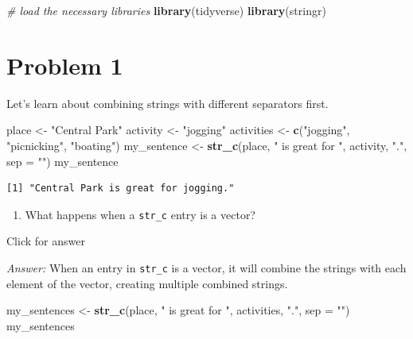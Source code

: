 \documentclass[
]{book}
\newenvironment{Shaded}{\begin{snugshade}}{\end{snugshade}}
\newcommand{\AttributeTok}[1]{\textcolor[rgb]{0.13,0.29,0.53}{#1}}
\newcommand{\CommentTok}[1]{\textcolor[rgb]{0.56,0.35,0.01}{\textit{#1}}}
\newcommand{\FunctionTok}[1]{\textcolor[rgb]{0.13,0.29,0.53}{\textbf{#1}}}
\newcommand{\NormalTok}[1]{#1}
\newcommand{\OtherTok}[1]{\textcolor[rgb]{0.56,0.35,0.01}{#1}}
\newcommand{\StringTok}[1]{\textcolor[rgb]{0.31,0.60,0.02}{#1}}
\providecommand{\tightlist}{%
  \setlength{\itemsep}{0pt}\setlength{\parskip}{0pt}}
\begin{document}
\begin{Shaded}
\begin{Highlighting}[]
\CommentTok{\# load the necessary libraries}
\FunctionTok{library}\NormalTok{(tidyverse)}
\FunctionTok{library}\NormalTok{(stringr)}
\end{Highlighting}
\end{Shaded}

\hypertarget{problem-1}{%
\section{Problem 1}\label{problem-1}}

Let's learn about combining strings with different separators first.

\begin{Shaded}
\begin{Highlighting}[]
\NormalTok{place }\OtherTok{\textless{}{-}} \StringTok{"Central Park"}
\NormalTok{activity }\OtherTok{\textless{}{-}} \StringTok{"jogging"}
\NormalTok{activities }\OtherTok{\textless{}{-}} \FunctionTok{c}\NormalTok{(}\StringTok{"jogging"}\NormalTok{, }\StringTok{"picnicking"}\NormalTok{, }\StringTok{"boating"}\NormalTok{)}
\NormalTok{my\_sentence }\OtherTok{\textless{}{-}} \FunctionTok{str\_c}\NormalTok{(place, }\StringTok{" is great for "}\NormalTok{, activity, }\StringTok{"."}\NormalTok{, }\AttributeTok{sep =} \StringTok{""}\NormalTok{)}
\NormalTok{my\_sentence}
\end{Highlighting}
\end{Shaded}

\begin{verbatim}
[1] "Central Park is great for jogging."
\end{verbatim}

\begin{enumerate}
\def\labelenumi{\alph{enumi}.}
\tightlist
\item
  What happens when a \texttt{str\_c} entry is a vector?
\end{enumerate}

Click for answer

\emph{Answer:} When an entry in \texttt{str\_c} is a vector, it will combine the strings with each element of the vector, creating multiple combined strings.

\begin{Shaded}
\begin{Highlighting}[]
\NormalTok{my\_sentences }\OtherTok{\textless{}{-}} \FunctionTok{str\_c}\NormalTok{(place, }\StringTok{" is great for "}\NormalTok{, activities, }\StringTok{"."}\NormalTok{, }\AttributeTok{sep =} \StringTok{""}\NormalTok{)}
\NormalTok{my\_sentences}
\end{Highlighting}
\end{Shaded}
\end{document}
